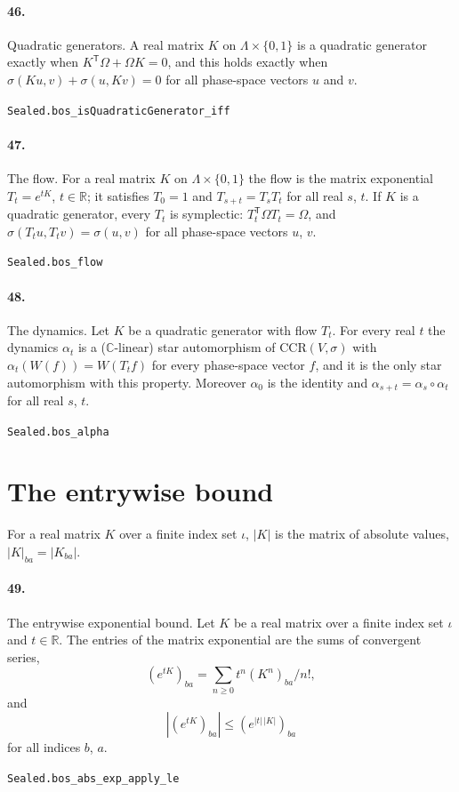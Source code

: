\documentclass[11pt]{article}
\begin{document}
\paragraph{46.} Quadratic generators. A real matrix $K$ on $\Lambda \times \{0, 1\}$ is a quadratic generator exactly when $K^{\mathsf T} \Omega + \Omega K = 0$, and this holds exactly when $\sigma(K u, v) + \sigma(u, K v) = 0$ for all phase-space vectors $u$ and $v$.\par{\footnotesize\texttt{Sealed.bos\_isQuadraticGenerator\_iff}}

\paragraph{47.} The flow. For a real matrix $K$ on $\Lambda \times \{0, 1\}$ the flow is the matrix exponential $T_t = e^{tK}$, $t \in \mathbb R$; it satisfies $T_0 = 1$ and $T_{s + t} = T_s T_t$ for all real $s$, $t$. If $K$ is a quadratic generator, every $T_t$ is symplectic: $T_t^{\mathsf T} \Omega T_t = \Omega$, and $\sigma(T_t u, T_t v) = \sigma(u, v)$ for all phase-space vectors $u$, $v$.\par{\footnotesize\texttt{Sealed.bos\_flow}}

\paragraph{48.} The dynamics. Let $K$ be a quadratic generator with flow $T_t$. For every real $t$ the dynamics $\alpha_t$ is a ($\mathbb C$-linear) star automorphism of $\mathrm{CCR}(V, \sigma)$ with $\alpha_t(W(f)) = W(T_t f)$ for every phase-space vector $f$, and it is the only star automorphism with this property. Moreover $\alpha_0$ is the identity and $\alpha_{s + t} = \alpha_s \circ \alpha_t$ for all real $s$, $t$.\par{\footnotesize\texttt{Sealed.bos\_alpha}}

\section*{The entrywise bound}
For a real matrix $K$ over a finite index set $\iota$, $|K|$ is the matrix of absolute values, $|K|_{ba} = |K_{ba}|$.

\paragraph{49.} The entrywise exponential bound. Let $K$ be a real matrix over a finite index set $\iota$ and $t \in \mathbb R$. The entries of the matrix exponential are the sums of convergent series, \[(e^{tK})_{ba} = \sum_{n \ge 0} t^n (K^n)_{ba} / n!,\] and \[|(e^{tK})_{ba}| \le (e^{|t|\,|K|})_{ba}\] for all indices $b$, $a$.\par{\footnotesize\texttt{Sealed.bos\_abs\_exp\_apply\_le}}
\end{document}
